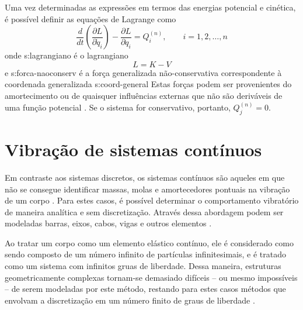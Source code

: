 \documentclass[12pt,openright,oneside,a4paper,
	chapter=TITLE,section=TITLE,
	english,brazil]{abntex2}
\begin{document}
	Uma vez determinadas as expressões em termos das energias potencial e cinética, é possível definir as equações de Lagrange como \cite{savi:2017}
	\begin{equation} \label{eqn:lagrange}
		\frac{d}{dt}\left(\frac{\partial L}{\partial \dot{q}_i}\right) - \frac{\partial L}{\partial q_i} = Q_i^{(n)}, \qquad i = 1, 2, \dots, n
	\end{equation}
	onde \gls{s:lagrangiano} é o lagrangiano
	\begin{equation}
		L = K-V
	\end{equation}
	e \gls{s:forca-naoconserv} é a força generalizada não-conservativa correspondente à coordenada generalizada \gls{s:coord-general} Estas forças podem ser provenientes do amortecimento ou de quaisquer influências externas que não são deriváveis de uma função potencial \cite{rao:2008}. Se o sistema for conservativo, portanto, $ Q_j^{(n)} = 0 $.
	
	\section{Vibração de sistemas contínuos}
	Em contraste aos sistemas discretos, os sistemas contínuos são aqueles em que não se consegue identificar massas, molas e amortecedores pontuais na vibração de um corpo \cite{rao:2008}. Para estes casos, é possível determinar o comportamento vibratório de maneira analítica e sem discretização. Através dessa abordagem podem ser modeladas barras, eixos, cabos, vigas e outros elementos \cite{timoshenko:1974}. 
	
	Ao tratar um corpo como um elemento elástico contínuo, ele é considerado como sendo composto de um número infinito de partículas infinitesimais, e é tratado como um sistema com infinitos gruas de liberdade. Dessa maneira, estruturas geometricamente complexas tornam-se demasiado difíceis -- ou mesmo impossíveis -- de serem modeladas por este método, restando para estes casos métodos que envolvam a discretização em um número finito de graus de liberdade \cite{timoshenko:1974}.
	
\end{document}

